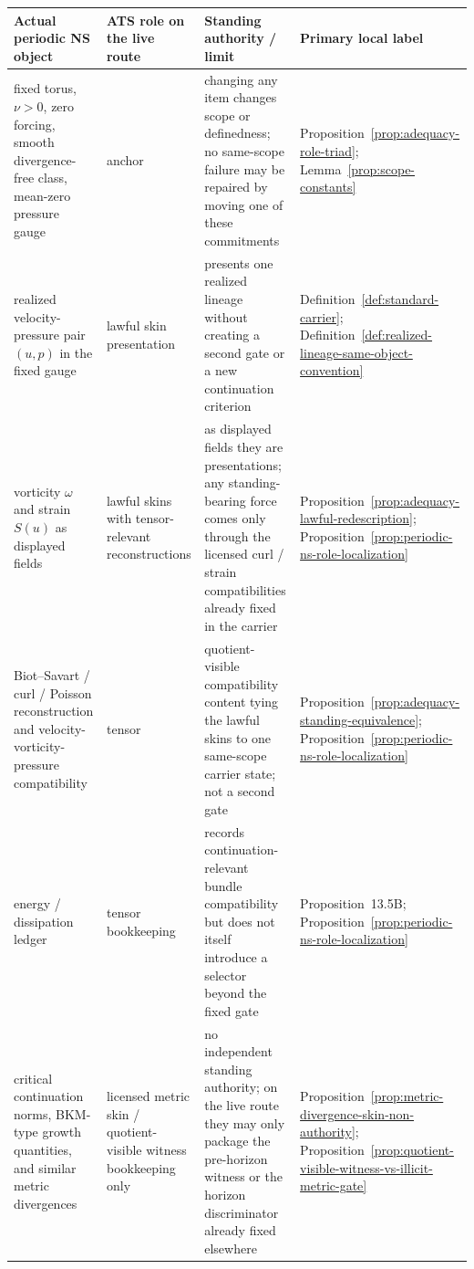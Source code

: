 \begin{table}[t]
\centering
\footnotesize
\setlength{\tabcolsep}{4pt}
\renewcommand{\arraystretch}{1.14}
\begin{tabularx}{0.98\textwidth}{@{}L{0.22\textwidth}L{0.18\textwidth}L{0.34\textwidth}Y@{}}
\toprule
\textbf{Actual periodic NS object} & \textbf{ATS role on the live route} & \textbf{Standing authority / limit} & \textbf{Primary local label} \\
\midrule
fixed torus, $\nu>0$, zero forcing, smooth divergence-free class, mean-zero pressure gauge & anchor & changing any item changes scope or definedness; no same-scope failure may be repaired by moving one of these commitments & Proposition~\ref{prop:adequacy-role-triad}; Lemma~\ref{prop:scope-constants} \\
\addlinespace
realized velocity-pressure pair $(u,p)$ in the fixed gauge & lawful skin presentation & presents one realized lineage without creating a second gate or a new continuation criterion & Definition~\ref{def:standard-carrier}; Definition~\ref{def:realized-lineage-same-object-convention} \\
\addlinespace
vorticity $\omega$ and strain $S(u)$ as displayed fields & lawful skins with tensor-relevant reconstructions & as displayed fields they are presentations; any standing-bearing force comes only through the licensed curl / strain compatibilities already fixed in the carrier & Proposition~\ref{prop:adequacy-lawful-redescription}; Proposition~\ref{prop:periodic-ns-role-localization} \\
\addlinespace
Biot--Savart / curl / Poisson reconstruction and velocity-vorticity-pressure compatibility & tensor & quotient-visible compatibility content tying the lawful skins to one same-scope carrier state; not a second gate & Proposition~\ref{prop:adequacy-standing-equivalence}; Proposition~\ref{prop:periodic-ns-role-localization} \\
\addlinespace
energy / dissipation ledger & tensor bookkeeping & records continuation-relevant bundle compatibility but does not itself introduce a selector beyond the fixed gate & Proposition~13.5B; Proposition~\ref{prop:periodic-ns-role-localization} \\
\addlinespace
critical continuation norms, BKM-type growth quantities, and similar metric divergences & licensed metric skin / quotient-visible witness bookkeeping only & no independent standing authority; on the live route they may only package the pre-horizon witness or the horizon discriminator already fixed elsewhere & Proposition~\ref{prop:metric-divergence-skin-non-authority}; Proposition~\ref{prop:quotient-visible-witness-vs-illicit-metric-gate} \\

\end{tabularx}
\end{table}
